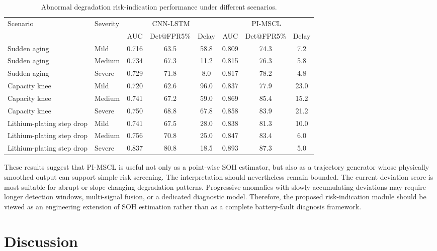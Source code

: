 \documentclass[pdflatex,sn-mathphys-num]{sn-jnl}
\begin{document}
\begin{table}[t]
\caption{Abnormal degradation risk-indication performance under different scenarios.}
\label{tab:risk_detection}
\centering
\begin{tabular}{llcccccc}
\toprule
Scenario & Severity & \multicolumn{3}{c}{CNN-LSTM} & \multicolumn{3}{c}{PI-MSCL} \\
\cmidrule(lr){3-5}\cmidrule(lr){6-8}
 & & AUC & Det@FPR5\% & Delay & AUC & Det@FPR5\% & Delay \\
\midrule
Sudden aging & Mild & 0.716 & 63.5 & 58.8 & 0.809 & 74.3 & 7.2 \\
Sudden aging & Medium & 0.734 & 67.3 & 11.2 & 0.815 & 76.3 & 5.8 \\
Sudden aging & Severe & 0.729 & 71.8 & 8.0 & 0.817 & 78.2 & 4.8 \\
Capacity knee & Mild & 0.720 & 62.6 & 96.0 & 0.837 & 77.9 & 23.0 \\
Capacity knee & Medium & 0.741 & 67.2 & 59.0 & 0.869 & 85.4 & 15.2 \\
Capacity knee & Severe & 0.750 & 68.8 & 67.8 & 0.858 & 83.9 & 21.2 \\
Lithium-plating step drop & Mild & 0.741 & 67.5 & 28.0 & 0.838 & 81.3 & 10.0 \\
Lithium-plating step drop & Medium & 0.756 & 70.8 & 25.0 & 0.847 & 83.4 & 6.0 \\
Lithium-plating step drop & Severe & 0.837 & 80.8 & 18.5 & 0.893 & 87.3 & 5.0 \\
\bottomrule
\end{tabular}
\end{table}

These results suggest that PI-MSCL is useful not only as a point-wise SOH estimator, but also as a trajectory generator whose physically smoothed output can support simple risk screening. The interpretation should nevertheless remain bounded. The current deviation score is most suitable for abrupt or slope-changing degradation patterns. Progressive anomalies with slowly accumulating deviations may require longer detection windows, multi-signal fusion, or a dedicated diagnostic model. Therefore, the proposed risk-indication module should be viewed as an engineering extension of SOH estimation rather than as a complete battery-fault diagnosis framework.

\fi

\section{Discussion}
\label{sec:discussion}
\end{document}
